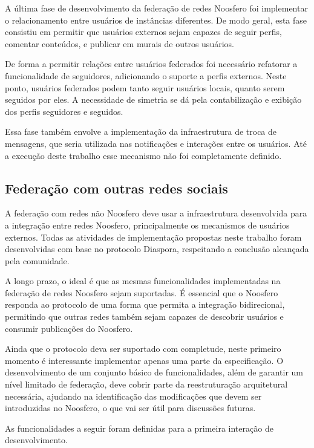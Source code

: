 A última fase de desenvolvimento da federação de redes Noosfero foi implementar o
relacionamento entre usuários de instâncias diferentes. De modo geral, esta fase
consistiu em permitir que usuários externos sejam capazes de seguir perfis, comentar
conteúdos, e publicar em murais de outros usuários.

De forma a permitir relações entre usuários federados foi necessário refatorar a
funcionalidade de seguidores, adicionando o suporte a perfis externos. Neste ponto,
usuários federados podem tanto seguir usuários locais, quanto serem seguidos por
eles. A necessidade de simetria se dá pela contabilização e exibição dos perfis
seguidores e seguidos.

Essa fase também envolve a implementação da infraestrutura de troca de mensagens,
que seria utilizada nas notificações e interações entre os usuários. Até a
execução deste trabalho esse mecanismo não foi completamente definido.


\subsection{Federação com outras redes sociais}
\label{subsec:federacao_externa}

A federação com redes não Noosfero deve usar a infraestrutura desenvolvida para a
integração entre redes Noosfero, principalmente os mecanismos de usuários externos.
Todas as atividades de implementação propostas neste trabalho foram desenvolvidas
com base no protocolo Diaspora, respeitando a conclusão alcançada pela comunidade.

A longo prazo, o ideal é que as mesmas funcionalidades implementadas na federação de
redes Noosfero sejam suportadas. É essencial que o Noosfero responda ao protocolo de
uma forma que permita a integração bidirecional, permitindo que outras redes
também sejam capazes de descobrir usuários e consumir publicações do Noosfero.

Ainda que o protocolo deva ser suportado com completude, neste primeiro momento é
interessante implementar apenas uma parte da especificação. O desenvolvimento de um
conjunto básico de funcionalidades, além de garantir um nível limitado de federação,
deve cobrir parte da reestruturação arquitetural necessária, ajudando na
identificação das modificações que devem ser introduzidas no Noosfero, o que vai ser
útil para discussões futuras.

As funcionalidades a seguir foram definidas para a primeira interação de
desenvolvimento.

